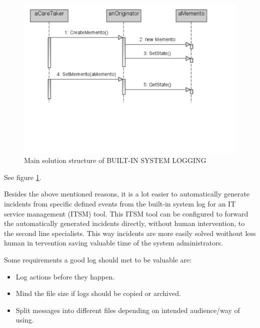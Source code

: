 \begin{figure}[h]
\centering
\includegraphics{patterns/systemLoggingDiagram.pdf}
\caption{Main solution structure of BUILT-IN SYSTEM LOGGING}
\label{fig:systemLogging}
\end{figure}

See figure \ref{fig:systemLogging}.

\begin{center}
   
\end{center}

Besides the above mentioned reasons, it is a lot easier to automatically generate incidents from specific defined events from the built-in system log for an IT service management (ITSM) tool. This ITSM tool can be configured to forward the automatically generated incidents directly, without human intervention, to the second line specialists. This way incidents are more easily solved woithout less human in tervention saving valuable time of the system administrators.

Some requirements a good log should met to be valuable are:
\begin{itemize}
	\item Log actions before they happen.
	\item Mind the file size if logs should be copied or archived.
	\item Split messages into different files depending on intended audience/way of using.
\end{itemize}

